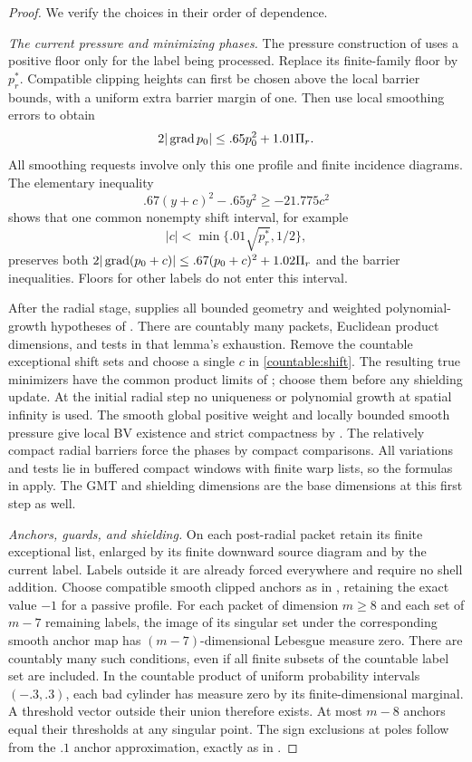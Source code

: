 \begin{proof}
We verify the choices in their order of dependence.

\emph{The current pressure and minimizing phases.}
The pressure construction of  uses a positive floor
only for the label being processed. Replace its finite-family floor
by $p_r^*$. Compatible clipping heights can first be chosen above the
local barrier bounds, with a uniform extra barrier margin of one.
Then use local smoothing errors to obtain
\[
 2|\operatorname{grad} p_0|\le .65p_0^2+1.01\Pi_r.
\]
All smoothing requests involve only this one profile and finite
incidence diagrams. The elementary inequality
\[
 .67(y+c)^2-.65y^2\ge-21.775c^2
\]
shows that one common nonempty shift interval, for example
\begin{equation}\label{countable:shift}
 |c|<\min\{.01\sqrt{p_r^*},1/2\},
\end{equation}
preserves both $2|\operatorname{grad}(p_0+c)|\le .67(p_0+c)^2+1.02\Pi_r$ and
the barrier inequalities. Floors for other labels do not enter this
interval.

After the radial stage,  supplies all bounded
geometry and weighted polynomial-growth hypotheses of
. There are countably many packets,
Euclidean product dimensions, and tests in that lemma's exhaustion.
Remove the countable exceptional shift sets and choose a single $c$
in \eqref{countable:shift}. The resulting true minimizers have the
common product limits of ; choose them before
any shielding update. At the initial radial step no uniqueness or
polynomial growth at spatial infinity is used. The smooth global
positive weight and locally bounded smooth pressure give local BV
existence and strict compactness by . The
relatively compact radial barriers force the phases by compact
comparisons. All variations and tests lie in buffered compact windows
with finite warp lists, so the formulas in 
apply. The GMT and shielding dimensions are the base dimensions at
this first step as well.

\emph{Anchors, guards, and shielding.}
On each post-radial packet retain its finite exceptional list, enlarged
by its finite downward source diagram and by the current label.
Labels outside it are already forced everywhere and require no shell
addition. Choose compatible smooth clipped anchors as in
, retaining the exact value $-1$ for a passive
profile. For each packet of dimension $m\ge8$ and each set of $m-7$
remaining labels, the image of its singular set under the corresponding
smooth anchor map has $(m-7)$-dimensional Lebesgue measure zero.
There are countably many such conditions, even if all finite subsets
of the countable label set are included. In the countable product of
uniform probability intervals $(-.3,.3)$, each bad cylinder has
measure zero by its finite-dimensional marginal. A threshold vector
outside their union therefore exists. At most $m-8$ anchors equal
their thresholds at any singular point. The sign exclusions at poles
follow from the $.1$ anchor approximation, exactly as in
.


\end{proof}
